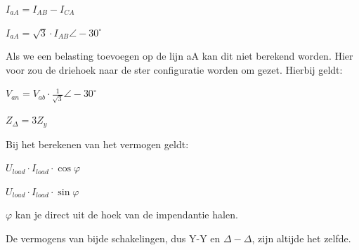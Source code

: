 $I_{aA}=I_{AB}-I_{CA}$

$I_{aA}=\sqrt{3}\cdot I_{AB} \angle -30^\circ$

\vspace{5mm}

Als we een belasting toevoegen op de lijn aA kan dit niet berekend worden. Hier voor zou de driehoek naar de ster configuratie
worden om gezet. Hierbij geldt:

$V_{an}=V_{ab}\cdot \frac{1}{\sqrt{3}}\angle -30^\circ$

$Z_\Delta =3Z_y$

\vspace{5mm}

Bij het berekenen van het vermogen geldt: 

$U_{load}\cdot I_{load} \cdot \cos \varphi$

$U_{load}\cdot I_{load} \cdot \sin \varphi$

$\varphi$ kan je direct uit de hoek van de impendantie halen.

\vspace{5mm}

De vermogens van bijde schakelingen, dus Y-Y en $\Delta - \Delta$, zijn altijde het zelfde.

